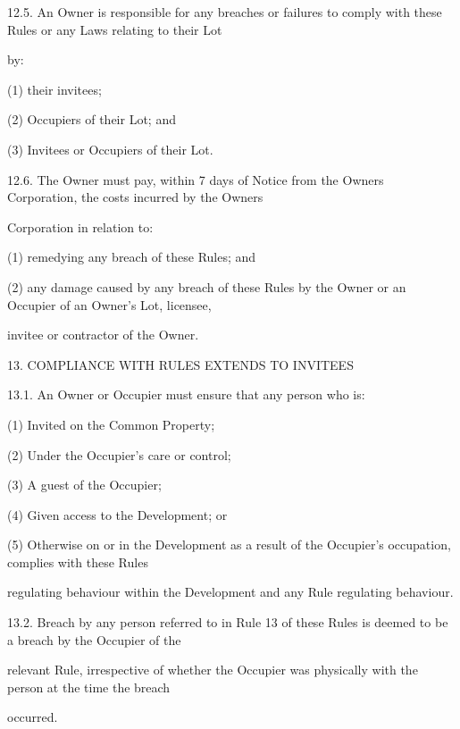 \documentclass{article}
\begin{document}
{\fontsize{9.99}{1}12.5. An Owner is responsible for any breaches or failures to comply with these Rules or any Laws relating to their Lot }

{\fontsize{10.02}{1}by: }

{\fontsize{9.962}{1}(1) their invitees; }

{\fontsize{9.962}{1}(2) Occupiers of their Lot; and }

{\fontsize{9.962}{1}(3) Invitees or Occupiers of their Lot. }

{\fontsize{9.99}{1}12.6. The Owner must pay, within 7 days of Notice from the Owners Corporation, the costs incurred by the Owners }

{\fontsize{10.02}{1}Corporation in relation to: }

{\fontsize{9.962}{1}(1) remedying any breach of these Rules; and }

{\fontsize{9.962}{1}(2) any damage caused by any breach of these Rules by the Owner or an Occupier of an Owner’s Lot, licensee, }

{\fontsize{10.02}{1}invitee or contractor of the Owner. }



{\fontsize{9.99}{1}13. COMPLIANCE WITH RULES EXTENDS TO INVITEES }

{\fontsize{9.99}{1}13.1. An Owner or Occupier must ensure that any person who is: }

{\fontsize{9.962}{1}(1) Invited on the Common Property; }

{\fontsize{9.962}{1}(2) Under the Occupier’s care or control; }

{\fontsize{9.962}{1}(3) A guest of the Occupier; }

{\fontsize{9.962}{1}(4) Given access to the Development; or }

{\fontsize{9.962}{1}(5) Otherwise on or in the Development as a result of the Occupier’s occupation, complies with these Rules }

{\fontsize{10.02}{1}regulating behaviour within the Development and any Rule regulating behaviour. }

{\fontsize{9.99}{1}13.2. Breach by any person referred to in Rule 13 of these Rules is deemed to be a breach by the Occupier of the }

{\fontsize{10.02}{1}relevant Rule, irrespective of whether the Occupier was physically with the person at the time the breach }

{\fontsize{10.02}{1}occurred. }
\end{document}
